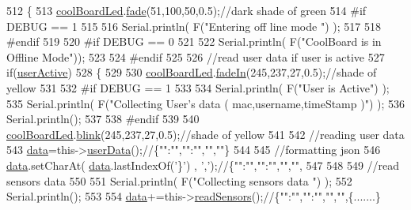 \begin{DoxyCode}
512 \{
513     \hyperlink{class_cool_board_a1b1d3c684a5baa56b08486e192fd8e97}{coolBoardLed}.\hyperlink{class_cool_board_led_af1cacbaa88db8bcf6042c1083ba41155}{fade}(51,100,50,0.5);\textcolor{comment}{//dark shade of green  }
514 \textcolor{preprocessor}{#if DEBUG == 1  }
515     
516     Serial.println( F(\textcolor{stringliteral}{"Entering off line mode "}) ); 
517     
518 \textcolor{preprocessor}{#endif}
519 
520 \textcolor{preprocessor}{#if DEBUG == 0}
521 
522     Serial.println( F(\textcolor{stringliteral}{"CoolBoard is in Offline Mode"}));
523 
524 \textcolor{preprocessor}{#endif}
525 
526     \textcolor{comment}{//read user data if user is active}
527     \textcolor{keywordflow}{if}(\hyperlink{class_cool_board_a6395459131d6889a3005f79c7a35e964}{userActive})
528     \{
529 
530         \hyperlink{class_cool_board_a1b1d3c684a5baa56b08486e192fd8e97}{coolBoardLed}.\hyperlink{class_cool_board_led_ab778f5e7bed0ab74e3906d82110493c3}{fadeIn}(245,237,27,0.5);\textcolor{comment}{//shade of yellow}
531 
532 \textcolor{preprocessor}{    #if DEBUG == 1}
533         
534         Serial.println( F(\textcolor{stringliteral}{"User is Active"}) );
535         Serial.println( F(\textcolor{stringliteral}{"Collecting User's data ( mac,username,timeStamp )"}) );
536         Serial.println();
537 
538 \textcolor{preprocessor}{    #endif}
539 
540         \hyperlink{class_cool_board_a1b1d3c684a5baa56b08486e192fd8e97}{coolBoardLed}.\hyperlink{class_cool_board_led_a96e1ea13003eee34c9dbcef340404426}{blink}(245,237,27,0.5);\textcolor{comment}{//shade of yellow   }
541 
542         \textcolor{comment}{//reading user data}
543         \hyperlink{class_cool_board_a427fb753dd8575bdf821c70a5c63d695}{data}=this->\hyperlink{class_cool_board_ae7358fb6e623cfc81b775f5f1734909b}{userData}();\textcolor{comment}{//\{"":"","":"","",""\}}
544 
545         \textcolor{comment}{//formatting json }
546         \hyperlink{class_cool_board_a427fb753dd8575bdf821c70a5c63d695}{data}.setCharAt( \hyperlink{class_cool_board_a427fb753dd8575bdf821c70a5c63d695}{data}.lastIndexOf(\textcolor{charliteral}{'\}'}) , \textcolor{charliteral}{','});\textcolor{comment}{//\{"":"","":"","","",}
547         
548                 
549         \textcolor{comment}{//read sensors data}
550 
551         Serial.println( F(\textcolor{stringliteral}{"Collecting sensors data "}) );
552         Serial.println();
553 
554         \hyperlink{class_cool_board_a427fb753dd8575bdf821c70a5c63d695}{data}+=this->\hyperlink{class_cool_board_ad03abdce2e65f520bbf2cff0f2d083cf}{readSensors}();\textcolor{comment}{//\{"":"","":"","","",\{.......\}}

\end{DoxyCode}
